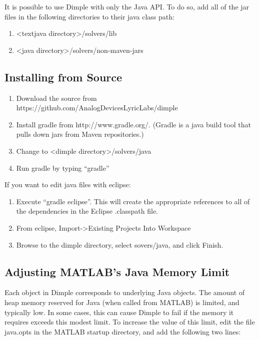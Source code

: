 \fi

\ifjava

It is possible to use Dimple with only the Java API.  To do so, add all of the jar files in the following directories to their java class path:

\begin{enumerate}
\item \textless textjava directory\textgreater /solvers/lib
\item \textless java directory\textgreater /solvers/non-maven-jars
\end{enumerate}

\fi

\subsection{Installing from Source}

\begin{enumerate}
\item Download the source from https://github.com/AnalogDevicesLyricLabs/dimple
\item Install gradle from http://www.gradle.org/.  (Gradle is a java build tool that pulls down jars from Maven repositories.)
\item Change to \textless dimple directory\textgreater /solvers/java 
\item Run gradle by typing ``gradle''
\end{enumerate}

If you want to edit java files with eclipse:

\begin{enumerate}
\item Execute ``gradle eclipse''.  This will create the appropriate references to all of the dependencies in the Eclipse .classpath file.
\item From eclipse, Import-\textgreater Existing Projects Into Workspace
\item Browse to the dimple directory, select sovers/java, and click Finish.
\end{enumerate}



\ifmatlab

\subsection{Adjusting MATLAB's Java Memory Limit}

Each object in Dimple corresponds to underlying Java objects. The amount of heap memory reserved for Java (when called from MATLAB) is limited, and typically low.  In some cases, this can cause Dimple to fail if the memory it requires exceeds this modest limit.  To increase the value of this limit, edit the file java.opts in the MATLAB startup directory, and add the following two lines:

